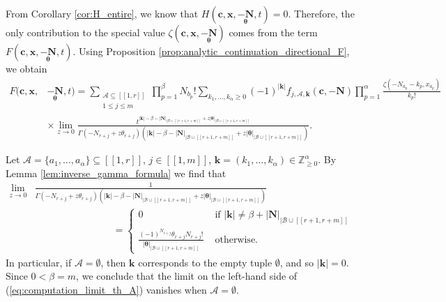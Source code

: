 \documentclass[a4paper]{amsart}
\theoremstyle{remark}
\theoremstyle{definition}
\begin{document}
From Corollary \ref{cor:H_entire}, we know that $H(\mathbf{c},\mathbf{x},\underset{\bm{\theta}}{-\mathbf{N}},t)=0$. Therefore, the only contribution to the special value $\zeta(\mathbf{c},\mathbf{x},\underset{\bm{\theta}}{-\mathbf{N}})$ comes from the term $F(\mathbf{c},\mathbf{x},\underset{\bm{\theta}}{-\mathbf{N}},t)$. Using Proposition \ref{prop:analytic_continuation_directional_F}, we obtain
\begin{align}
    F(\mathbf{c},\mathbf{x},&\underset{\bm{\theta}}{-\mathbf{N}},t) = \sum_{\substack{\mathcal{A} \subseteq [\![1,r]\!] \\ 1 \leq j \leq m}} \prod_{p=1}^{\beta} N_{b_p}! \sum_{k_1,\ldots,k_{\alpha}\geq 0} (-1)^{|\mathbf{k}|} f_{j,\mathcal{A},\mathbf{k}}(\mathbf{c},-\mathbf{N}) \prod_{p=1}^{\alpha} \frac{\zeta(-N_{a_p}-k_p,x_{a_p})}{k_p!} \nonumber \\
    & \times \lim_{z \to 0}\frac{t^{|\mathbf{k}|-\beta-|\mathbf{N}|_{|\mathcal{B}\cup [\![ r+1,r+m ]\!]}+z|\bm{\theta}|_{|\mathcal{B}\cup [\![ r+1,r+m ]\!]}}}{\Gamma(-N_{r+j}+z\theta_{r+j})(|\mathbf{k}|-\beta-|\mathbf{N}|_{|\mathcal{B}\cup [\![ r+1,r+m ]\!]}+z|\bm{\theta}|_{|\mathcal{B}\cup [\![ r+1,r+m ]\!]})}. \label{eq:directional_formula_F_proof_thA}
\end{align}

Let $\mathcal{A}=\{ a_1,\ldots,a_{\alpha} \} \subseteq [\![1,r]\!]$, $j \in [\![ 1,m ]\!]$, $\mathbf{k}=(k_1,\ldots,k_{\alpha}) \in \mathbb{Z}_{\geq 0}^{\alpha}$. By Lemma \ref{lem:inverse_gamma_formula} we find that
\begin{align}
    \lim_{z \to 0}&\frac{1}{\Gamma(-N_{r+j}+z\theta_{r+j})(|\mathbf{k}|-\beta-|\mathbf{N}|_{|\mathcal{B}\cup [\![ r+1,r+m ]\!]}+z|\bm{\theta}|_{|\mathcal{B}\cup [\![ r+1,r+m ]\!]})} \nonumber \\
    &\qquad \qquad \qquad \qquad =
    \begin{cases}
        0 & \text{ if } |\mathbf{k}| \neq \beta+|\mathbf{N}|_{|\mathcal{B}\cup [\![ r+1,r+m ]\!]} \\
        \frac{(-1)^{N_{r+j}}\theta_{r+j}N_{r+j}!}{|\bm{\theta}|_{|\mathcal{B}\cup [\![ r+1,r+m ]\!]}} & \text{ otherwise.}
    \end{cases}
    \label{eq:computation_limit_th_A}
\end{align}
In particular, if $\mathcal{A}=\emptyset$, then $\mathbf{k}$ corresponds to the empty tuple $\emptyset$, and so $|\mathbf{k}|=0$. Since $0<\beta=m$, we conclude that the limit on the left-hand side of (\ref{eq:computation_limit_th_A}) vanishes when $\mathcal{A}=\emptyset$.
\end{document}
